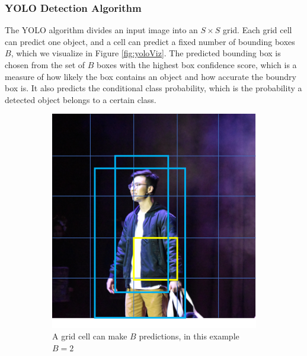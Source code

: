 \subsubsection{YOLO Detection Algorithm}
The YOLO algorithm divides an input image into an $S\times S$ grid. Each grid cell can predict one object, and a cell can predict a fixed number of bounding boxes $B$, which we visualize in Figure \ref{fig:yoloViz}. The predicted bounding box is chosen from the set of $B$ boxes with the highest box confidence score, which is a measure of how likely the box contains an object and how accurate the boundry box is. It also predicts the conditional class probability, which is the probability a detected object belongs to a certain class. 

\begin{figure}[ht]
	\begin{subfigure}[b]{.45\textwidth}
		\centering
		\includegraphics[width=1.0\linewidth]{img/chapter5_implementation/yoloAlgo1.png}
		\caption{A grid cell can make $B$ predictions, in this example $B=2$}
	\end{subfigure}%
	\hspace{\fill} 
	\begin{subfigure}[b]{.45\textwidth}
		\centering

\end{subfigure}
\end{figure}
